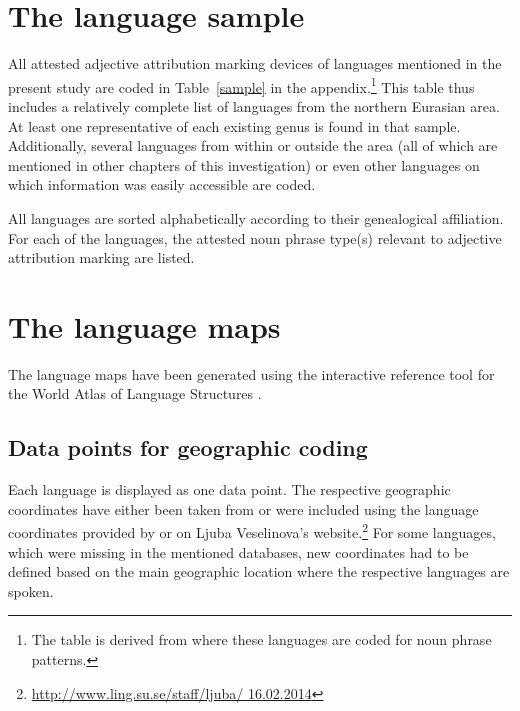 \section{The language sample}
All attested adjective attribution marking devices of languages mentioned in the present study are coded in Table~\ref{sample} in the appendix.\footnote{The table is derived from \citet{AUTOTYP-NP} where these languages are coded for noun phrase patterns.} This table thus includes a relatively complete list of languages from the northern Eurasian area. At least one representative of each existing genus is found in that sample. Additionally, several languages from within or outside the area (all of which are mentioned in other chapters of this investigation) or even other languages on which information was easily accessible are coded.

All languages are sorted alphabetically according to their genealogical affiliation. For each of the languages, the attested noun phrase type(s) relevant to adjective attribution marking are listed.

\section{The language maps}
The language maps have been generated using the interactive reference tool 
for the World Atlas of Language Structures \citep{bibiko2005}. 

\subsection[Geographic coding]{Data points for geographic coding}
Each language is displayed as one data point. The respective geographic coordinates have either been taken from \cite{walsOnline2013} or were included using the language coordinates provided by \cite{AUTOTYP} or on Ljuba Veselinova's website.\footnote{\url{http://www.ling.su.se/staff/ljuba/ 16.02.2014}} For some languages, which were missing in the mentioned databases, new coordinates had to be defined based on the main geographic location where the respective languages are spoken.

